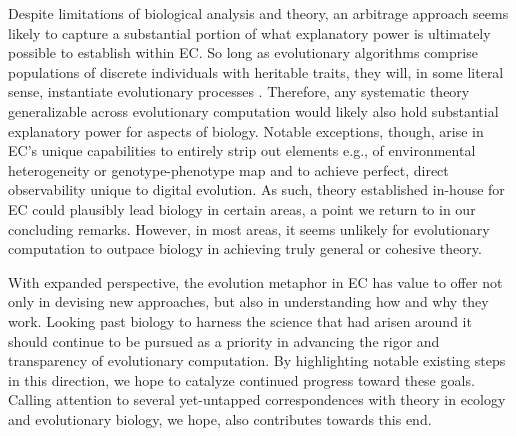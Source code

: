 Despite limitations of biological analysis and theory, an arbitrage approach seems likely to capture a substantial portion of what explanatory power is ultimately possible to establish within EC.
So long as evolutionary algorithms comprise populations of discrete individuals with heritable traits, they will, in some literal sense, instantiate evolutionary processes \citep{pennock2007models}.
Therefore, any systematic theory generalizable across evolutionary computation would likely also hold substantial explanatory power for aspects of biology.
Notable exceptions, though, arise in EC's unique capabilities to entirely strip out elements e.g., of environmental heterogeneity or genotype-phenotype map and to achieve perfect, direct observability unique to digital evolution.
As such, theory established in-house for EC could plausibly lead biology in certain areas, a point we return to in our concluding remarks.
However, in most areas, it seems unlikely for evolutionary computation to outpace biology in achieving truly general or cohesive theory.

With expanded perspective, the evolution metaphor in EC has value to offer not only in devising new approaches, but also in understanding how and why they work.
Looking past biology to harness the science that had arisen around it should continue to be pursued as a priority in advancing the rigor and transparency of evolutionary computation.
By highlighting notable existing steps in this direction, we hope to catalyze continued progress toward these goals.
Calling attention to several yet-untapped correspondences with theory in ecology and evolutionary biology, we hope, also contributes towards this end.
